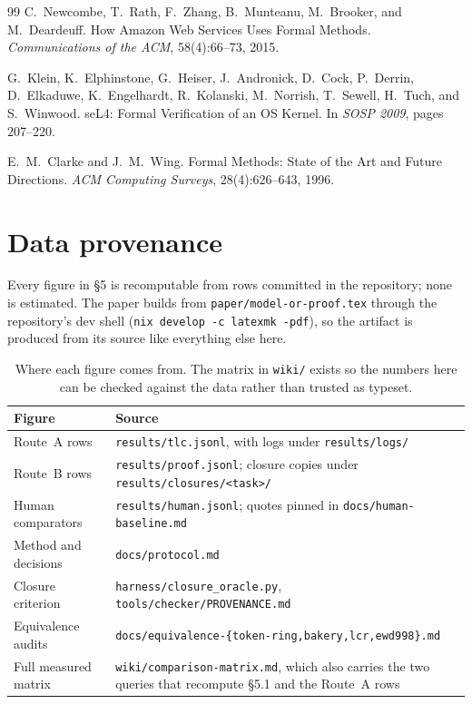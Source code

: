 \documentclass[11pt,a4paper]{article}
\begin{document}
\begin{thebibliography}{99}
C.~Newcombe, T.~Rath, F.~Zhang, B.~Munteanu, M.~Brooker, and M.~Deardeuff.
\newblock How Amazon Web Services Uses Formal Methods.
\newblock \emph{Communications of the ACM}, 58(4):66--73, 2015.

G.~Klein, K.~Elphinstone, G.~Heiser, J.~Andronick, D.~Cock, P.~Derrin, D.~Elkaduwe, K.~Engelhardt,
R.~Kolanski, M.~Norrish, T.~Sewell, H.~Tuch, and S.~Winwood.
\newblock seL4: Formal Verification of an OS Kernel.
\newblock In \emph{SOSP 2009}, pages 207--220.

E.~M.~Clarke and J.~M.~Wing.
\newblock Formal Methods: State of the Art and Future Directions.
\newblock \emph{ACM Computing Surveys}, 28(4):626--643, 1996.

\end{thebibliography}

\appendix
\section{Data provenance}

Every figure in \S5 is recomputable from rows committed in the repository; none is estimated. The
paper builds from \texttt{paper/model-or-proof.tex} through the repository's dev shell
(\texttt{nix develop -c latexmk -pdf}), so the artifact is produced from its source like everything
else here.

\begin{table}[htbp]
\centering
\small
\begin{tabular}{@{}>{\raggedright\arraybackslash}p{}>{\raggedright\arraybackslash}p{}@{}}
\toprule
Figure & Source \\
\midrule
Route~A rows & \texttt{results/tlc.jsonl}, with logs under \texttt{results/logs/} \\
Route~B rows & \texttt{results/proof.jsonl}; closure copies under \texttt{results/closures/<task>/} \\
Human comparators & \texttt{results/human.jsonl}; quotes pinned in \texttt{docs/human-baseline.md} \\
Method and decisions & \texttt{docs/protocol.md} \\
Closure criterion & \texttt{harness/closure\_oracle.py}, \texttt{tools/checker/PROVENANCE.md} \\
Equivalence audits & \texttt{docs/equivalence-\{token-ring,bakery,lcr,ewd998\}.md} \\
Full measured matrix & \texttt{wiki/comparison-matrix.md}, which also carries the two queries that
recompute \S5.1 and the Route~A rows \\
\bottomrule
\end{tabular}
\caption{Where each figure comes from. The matrix in \texttt{wiki/} exists so the numbers here can
be checked against the data rather than trusted as typeset.}
\end{table}
\end{document}
